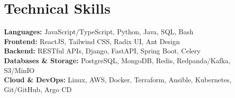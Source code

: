 \documentclass[letterpaper,11pt]{article}
\begin{document}
\section{Technical Skills}
\begin{itemize}[leftmargin=0.15in, label={}]
  \small{\item{
    \textbf{Languages:} JavaScript/TypeScript, Python, Java, SQL, Bash \\
    \textbf{Frontend:} ReactJS, Tailwind CSS, Radix UI, Ant Design \\
    \textbf{Backend:} RESTful APIs, Django, FastAPI, Spring Boot, Celery \\
    \textbf{Databases \& Storage:} PostgreSQL, MongoDB, Redis, Redpanda/Kafka, S3/MinIO \\
    \textbf{Cloud \& DevOps:} Linux, AWS, Docker, Terraform, Ansible, Kubernetes, Git/GitHub, Argo CD\\
  }}
\end{itemize}
\end{document}
